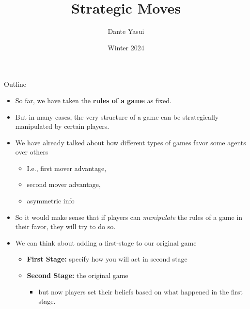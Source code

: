 \documentclass{beamer}
\title{Strategic Moves}
\author{Dante Yasui }
\institute{EC327 Game Theory}
\date{Winter 2024}
\theoremstyle{plain}
\begin{document}
\begin{frame}[plain]
    \titlepage
\end{frame}
\addtocounter{framenumber}{-1}

\begin{frame}[plain]{Outline}
  \tableofcontents
\end{frame}
\addtocounter{framenumber}{-1}


\begin{frame}{}
  \begin{itemize}
    \item So far, we have taken the \textbf{rules of a game} as fixed. 
    \item But in many cases, the very structure of a game can be 
    \alert{strategically manipulated} by certain players.
  \end{itemize}
\end{frame}


\begin{frame}{}
  \begin{itemize}
    \item We have already talked about how different types of games 
    favor some agents over others 
    \begin{itemize}
      \item I.e., first mover advantage, 
      \item second mover advantage, 
      \item asymmetric info 
    \end{itemize}
    \item So it would make sense that if players can \textit{manipulate}
    the rules of a game in their favor, they will try to do so.
  \end{itemize}  
\end{frame}


\begin{frame}{}
  \begin{itemize}
    \item We can think about adding a first-stage to our original game 
    \begin{itemize}
      \item \textbf{First Stage:} specify how you will act in second stage 
      \item \textbf{Second Stage:} the original game
      \begin{itemize}
        \item but now players set their beliefs based on what happened
        in the first stage.
      \end{itemize}
    \end{itemize}
  \end{itemize}  
\end{frame}
\end{document}
